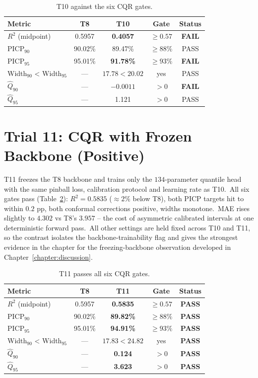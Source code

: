 \begin{table}[htbp]
\centering
\caption[Trial 10 gate check]{T10 against the six CQR gates.}
\label{tab:t10_gates}
\begin{tabular}{lcccc}
\toprule
Metric & T8 & T10 & Gate & Status \\
\midrule
$R^2$ (midpoint) & 0.5957 & \textbf{0.4057} & $\geq 0.57$ & \textbf{FAIL} \\
PICP$_{90}$ & 90.02\% & 89.47\% & $\geq 88\%$ & PASS \\
PICP$_{95}$ & 95.01\% & \textbf{91.78\%} & $\geq 93\%$ & \textbf{FAIL} \\
Width$_{90}$ < Width$_{95}$ & --- & $17.78 < 20.02$ & yes & PASS \\
$\hat Q_{90}$ & --- & \textbf{$-0.0011$} & $> 0$ & \textbf{FAIL} \\
$\hat Q_{95}$ & --- & 1.121 & $> 0$ & PASS \\
\bottomrule
\end{tabular}
\end{table}

\section{Trial 11: CQR with Frozen Backbone (Positive)}\label{sec:t11_results}

T11 freezes the T8 backbone and trains only the $134$-parameter quantile head with the same pinball loss, calibration protocol and learning rate as T10.\ All six gates pass (Table~\ref{tab:t11_gates}): $R^2 = 0.5835$ ($\approx 2\%$ below T8), both PICP targets hit to within $0.2$ pp, both conformal corrections positive, widths monotone.\ MAE rises slightly to $4.302$ vs T8's $3.957$ -- the cost of asymmetric calibrated intervals at one deterministic forward pass.\ All other settings are held fixed across T10 and T11, so the contrast isolates the backbone-trainability flag and gives the strongest evidence in the chapter for the freezing-backbone observation developed in Chapter~\ref{chapter:discussion}.

\begin{table}[htbp]
\centering
\caption[Trial 11 gate check]{T11 passes all six CQR gates.}
\label{tab:t11_gates}
\begin{tabular}{lcccc}
\toprule
Metric & T8 & T11 & Gate & Status \\
\midrule
$R^2$ (midpoint) & 0.5957 & \textbf{0.5835} & $\geq 0.57$ & \textbf{PASS} \\
PICP$_{90}$ & 90.02\% & \textbf{89.82\%} & $\geq 88\%$ & \textbf{PASS} \\
PICP$_{95}$ & 95.01\% & \textbf{94.91\%} & $\geq 93\%$ & \textbf{PASS} \\
Width$_{90}$ < Width$_{95}$ & --- & $17.83 < 24.82$ & yes & \textbf{PASS} \\
$\hat Q_{90}$ & --- & \textbf{0.124} & $> 0$ & \textbf{PASS} \\
$\hat Q_{95}$ & --- & \textbf{3.623} & $> 0$ & \textbf{PASS} \\
\bottomrule
\end{tabular}
\end{table}

